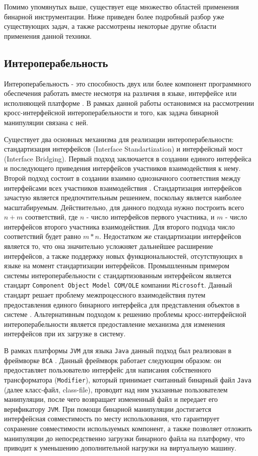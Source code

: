 Помимо упомянутых выше, существует еще множество областей применения бинарной инструментации. Ниже приведен более подробный разбор уже существующих задач, а также рассмотрены некоторые другие области применения данной техники.

\subsection{Интероперабельность}

Интероперабельность - это способность двух или более компонент программного обеспечения работать вместе несмотря на различия в языке, интерфейсе или исполняющей платформе \cite{malone2014}. В рамках данной работы остановимся на рассмотрении кросс-интерфейсной интероперабельности и того, как задача бинарной манипуляции связана с ней.

Существует два основных механизма для реализации интероперабельности: стандартизация интерфейсов (Interface Standartization) и интерфейсный мост (Interface Bridging). Первый подход заключается в создании единого интерфейса и последующего приведения интерфейсов участников взаимодействия к нему. Второй подход состоит в создании взаимно однозначного соответствия между интерфейсами всех участников взаимодействия \cite{wegner1996}. Стандартизация интерфейсов зачастую является предпочтительным решением, поскольку является наиболее масштабируемым. Действительно, для данного подхода нужно построить всего $n + m$ соответствий, где $n$ - число интерфейсов первого участника, и $m$ - число интерфейсов второго участника взаимодействия. Для второго подхода число соответствий будет равно $m * n$. Недостатком же стандартизации интерфейсов является то, что она значительно усложняет дальнейшее расширение интерфейсов, а также поддержку новых функциональностей, отсутствующих в языке на момент стандартизации интерфейсов. Промышленным примером системы интероперабельности с стандартизованным интерфейсом является стандарт \texttt{Component~Object~Model~COM/OLE} компании \texttt{Microsoft}. Данный стандарт решает проблему межпроцессного взаимодействия путем предоставления единого бинарного интерфейса для представления объектов в системе \cite{brockschmidt1995}. Альтернативным подходом к решению проблемы кросс-интерфейсной интероперабельности является предоставление механизма для изменения интерфейсов при их загрузке в систему.

В рамках платформы \texttt{JVM} для языка \texttt{Java} данный подход был реализован в фреймворке \texttt{BCA} \cite{bca}. Данный фреймворк работает следующим образом: он предоставляет пользователю интерфейс для написания собственного трансформатора (\texttt{Modifier}), который принимает считанный бинарный файл \texttt{Java} (далее класс-файл, class-file), проводит над ним указанные пользователем манипуляции, после чего возвращает измененный файл и передает его верификатору \texttt{JVM}. При помощи бинарной манипуляции достигается интерфейсная совместимость по месту использования, что гарантирует сохранение совместимости используемых компонент, а также позволяет отложить манипуляции до непосредственно загрузки бинарного файла на платформу, что приводит к уменьшению дополнительной нагрузки на виртуальную машину.

